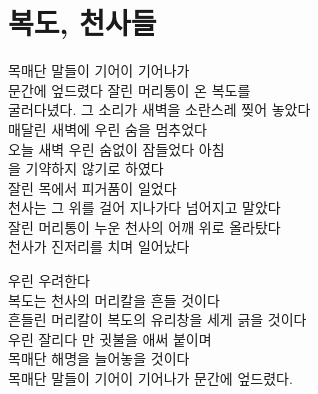 \hypertarget{uxbcf5uxb3c4-uxcc9cuxc0acuxb4e4}{%

\section{복도, 천사들}\label{uxbcf5uxb3c4-uxcc9cuxc0acuxb4e4}}



목매단 말들이 기어이 기어나가\\

문간에 엎드렸다 잘린 머리통이 온 복도를\\

굴러다녔다. 그 소리가 새벽을 소란스레 찢어 놓았다\\

매달린 새벽에 우린 숨을 멈추었다\\

오늘 새벽 우린 숨없이 잠들었다 아침\\

을 기약하지 않기로 하였다\\

잘린 목에서 피거품이 일었다\\

천사는 그 위를 걸어 지나가다 넘어지고 말았다\\

잘린 머리통이 누운 천사의 어깨 위로 올라탔다\\

천사가 진저리를 치며 일어났다



우린 우려한다\\

복도는 천사의 머리칼을 흔들 것이다\\

흔들린 머리칼이 복도의 유리창을 세게 긁을 것이다\\

우린 잘리다 만 귓불을 애써 붙이며\\

목매단 해명을 늘어놓을 것이다\\

목매단 말들이 기어이 기어나가 문간에 엎드렸다.


